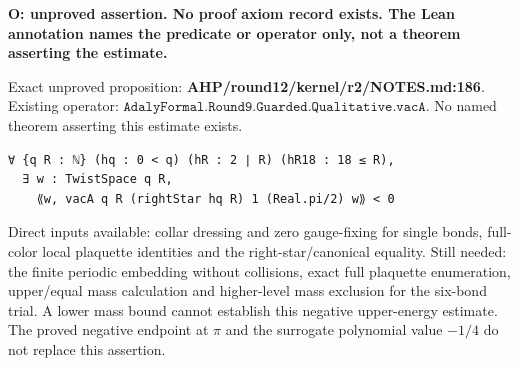 \begin{theorem}
\label{open-negative}
\textbf{O: unproved assertion. No proof axiom record exists. The Lean annotation names the predicate or operator only, not a theorem asserting the estimate.}

Exact unproved proposition: \textbf{AHP/round12/kernel/r2/NOTES.md:186}. Existing operator: \(\texttt{AdalyFormal.Round9.Guarded.Qualitative.vacA}\). No named theorem asserting this estimate exists.



\begin{verbatim}
∀ {q R : ℕ} (hq : 0 < q) (hR : 2 ∣ R) (hR18 : 18 ≤ R),
  ∃ w : TwistSpace q R,
    ⟪w, vacA q R (rightStar hq R) 1 (Real.pi/2) w⟫ < 0
\end{verbatim}


Direct inputs available: collar dressing and zero gauge-fixing for single bonds, full-color local plaquette identities and the right-star/canonical equality. Still needed: the finite periodic embedding without collisions, exact full plaquette enumeration, upper/equal mass calculation and higher-level mass exclusion for the six-bond trial. A lower mass bound cannot establish this negative upper-energy estimate. The proved negative endpoint at \(\pi\) and the surrogate polynomial value \(-1/4\) do not replace this assertion.


\end{theorem}


